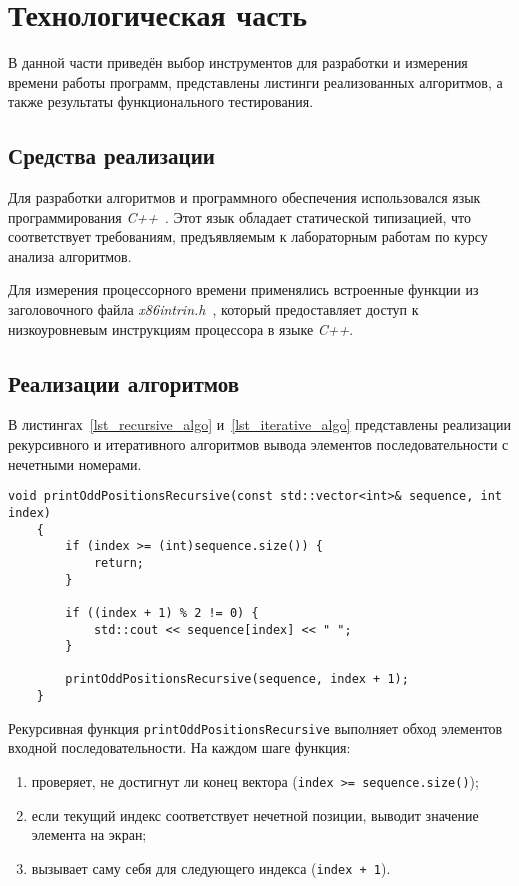 \chapter{Технологическая часть}

В данной части приведён выбор инструментов для разработки и измерения времени работы программ, представлены листинги реализованных алгоритмов, а также результаты функционального тестирования.

\section{Средства реализации}

Для разработки алгоритмов и программного обеспечения использовался язык программирования \textit{C++}~\cite{cpp}. 
Этот язык обладает статической типизацией, что соответствует требованиям, предъявляемым к лабораторным работам по курсу анализа алгоритмов.

Для измерения процессорного времени применялись встроенные функции из заголовочного файла \textit{x86intrin.h}~\cite{intrin}, 
который предоставляет доступ к низкоуровневым инструкциям процессора в языке \textit{C++}.

\section{Реализации алгоритмов}

В листингах~\ref{lst_recursive_algo} и~\ref{lst_iterative_algo} представлены реализации рекурсивного и итеративного алгоритмов
вывода элементов последовательности с нечетными номерами.

\begin{lstlisting}[label=lst_recursive_algo, caption=Реализация рекурсивного алгоритма вывода элементов последовательности с нечетными номерами]
	void printOddPositionsRecursive(const std::vector<int>& sequence, int index)
	{
		if (index >= (int)sequence.size()) {
			return;
		}
		
		if ((index + 1) % 2 != 0) {
			std::cout << sequence[index] << " ";
		}
		
		printOddPositionsRecursive(sequence, index + 1);
	}
\end{lstlisting}

Рекурсивная функция \texttt{printOddPositionsRecursive} выполняет обход элементов входной последовательности.
На каждом шаге функция:
\begin{enumerate}
	\item проверяет, не достигнут ли конец вектора (\texttt{index >= sequence.size()});
	\item если текущий индекс соответствует нечетной позиции, выводит значение элемента на экран;
	\item вызывает саму себя для следующего индекса (\texttt{index + 1}).
\end{enumerate}

